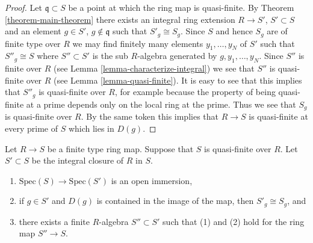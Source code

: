 \begin{proof}
Let $\mathfrak q \subset S$ be a point at which the ring map
is quasi-finite. By Theorem \ref{theorem-main-theorem}
there exists an integral ring extension $R \to S'$, $S' \subset S$
and an element $g \in S'$, $g\not \in \mathfrak q$ such that
$S'_g \cong S_g$. Since $S$ and hence $S_g$ are of finite type
over $R$ we may find finitely many elements
$y_1, \ldots, y_N$ of $S'$ such that $S''_g \cong S$
where $S'' \subset S'$ is the sub $R$-algebra generated
by $g, y_1, \ldots, y_N$. Since $S''$ is finite over $R$
(see Lemma \ref{lemma-characterize-integral}) we see that
$S''$ is quasi-finite over $R$ (see Lemma \ref{lemma-quasi-finite}).
It is easy to see that this implies that $S''_g$ is quasi-finite over $R$,
for example because the property of being quasi-finite at a prime depends
only on the local ring at the prime. Thus we see that $S_g$ is quasi-finite
over $R$. By the same token this implies that $R \to S$ is quasi-finite
at every prime of $S$ which lies in $D(g)$.
\end{proof}

\begin{lemma}
\label{lemma-quasi-finite-open-integral-closure}
Let $R \to S$ be a finite type ring map.
Suppose that $S$ is quasi-finite over $R$.
Let $S' \subset S$ be the integral closure of
$R$ in $S$.
\begin{enumerate}
\item $\text{Spec}(S) \to \text{Spec}(S')$ is
an open immersion,
\item if $g \in S'$ and $D(g)$ is contained in the image
of the map, then $S'_g \cong S_g$, and
\item there exists a finite $R$-algebra $S'' \subset S'$
such that (1) and (2) hold for the ring map
$S'' \to S$.
\end{enumerate}
\end{lemma}

